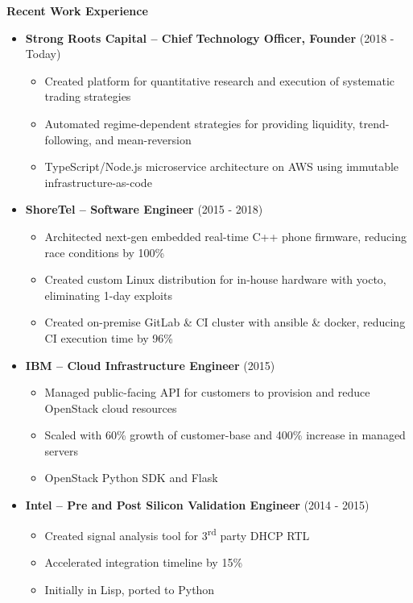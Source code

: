 \documentclass{report}
\begin{document}
\textbf{Recent Work Experience}
\begin{itemize}[label=$\cdot$]

\item \textbf{Strong Roots Capital -- Chief Technology Officer, Founder} (2018 - Today)
  \begin{itemize}[label=$\circ$]
  \item Created platform for quantitative research and execution of systematic trading strategies
  \item Automated regime-dependent strategies for providing liquidity, trend-following, and mean-reversion
  \item TypeScript/Node.js microservice architecture on AWS using immutable infrastructure-as-code
  \end{itemize}

\item \textbf{ShoreTel -- Software Engineer} (2015 - 2018)
  \begin{itemize}[label=$\circ$]
  \item Architected next-gen embedded real-time C++ phone firmware, reducing race conditions by 100\%
  \item Created custom Linux distribution for in-house hardware with yocto, eliminating 1-day exploits
  \item Created on-premise GitLab \& CI cluster with ansible \& docker, reducing CI execution time by 96\%
  \end{itemize}

\item \textbf{IBM -- Cloud Infrastructure Engineer} (2015)
  \begin{itemize}[label=$\circ$]
  \item Managed public-facing API for customers to provision and reduce OpenStack cloud resources
  \item Scaled with 60\% growth of customer-base and 400\% increase in managed servers
  \item OpenStack Python SDK and Flask
  \end{itemize}

\item \textbf{Intel -- Pre and Post Silicon Validation Engineer} (2014 - 2015)
  \begin{itemize}[label=$\circ$]
  \item Created signal analysis tool for 3\textsuperscript{rd} party DHCP RTL
  \item Accelerated integration timeline by 15\%
  \item Initially in Lisp, ported to Python
  \end{itemize}


\end{itemize}
\end{document}
